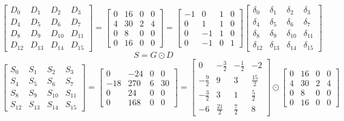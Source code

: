 \documentclass{article}%
\begin{document}
\[%
\left[\begin{matrix}D_{0} & D_{1} & D_{2} & D_{3}\\D_{4} & D_{5} & D_{6} & D_{7}\\D_{8} & D_{9} & D_{10} & D_{11}\\D_{12} & D_{13} & D_{14} & D_{15}\end{matrix}\right] = \left[\begin{matrix}0 & 16 & 0 & 0\\4 & 30 & 2 & 4\\0 & 8 & 0 & 0\\0 & 16 & 0 & 0\end{matrix}\right] = \left[\begin{matrix}-1 & 0 & 1 & 0\\0 & 1 & 1 & 0\\0 & -1 & 1 & 0\\0 & -1 & 0 & 1\end{matrix}\right] \left[\begin{matrix}\delta_{0} & \delta_{1} & \delta_{2} & \delta_{3}\\\delta_{4} & \delta_{5} & \delta_{6} & \delta_{7}\\\delta_{8} & \delta_{9} & \delta_{10} & \delta_{11}\\\delta_{12} & \delta_{13} & \delta_{14} & \delta_{15}\end{matrix}\right]%
\]%
\[%
S = G \odot D%
\]%
\[%
\left[\begin{matrix}S_{0} & S_{1} & S_{2} & S_{3}\\S_{4} & S_{5} & S_{6} & S_{7}\\S_{8} & S_{9} & S_{10} & S_{11}\\S_{12} & S_{13} & S_{14} & S_{15}\end{matrix}\right] = \left[\begin{matrix}0 & -24 & 0 & 0\\-18 & 270 & 6 & 30\\0 & 24 & 0 & 0\\0 & 168 & 0 & 0\end{matrix}\right] = \left[\begin{matrix}0 & - \frac{3}{2} & - \frac{1}{2} & -2\\- \frac{9}{2} & 9 & 3 & \frac{15}{2}\\- \frac{3}{2} & 3 & 1 & \frac{5}{2}\\-6 & \frac{21}{2} & \frac{7}{2} & 8\end{matrix}\right] \odot \left[\begin{matrix}0 & 16 & 0 & 0\\4 & 30 & 2 & 4\\0 & 8 & 0 & 0\\0 & 16 & 0 & 0\end{matrix}\right]%
\]%
\end{document}
